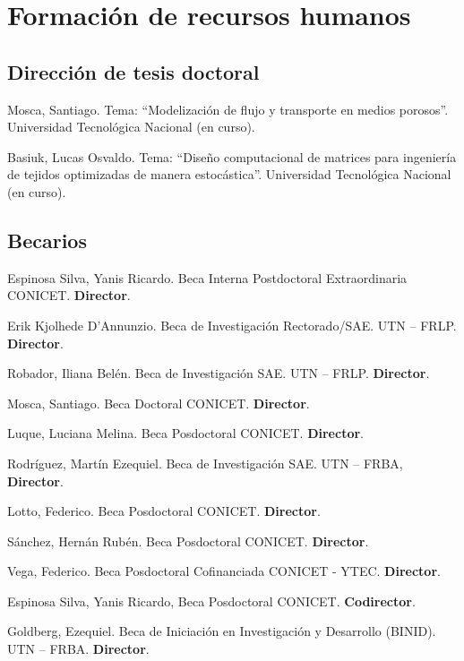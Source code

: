 \section{Formación de recursos humanos}

\subsection{Dirección de tesis doctoral}
 Mosca, Santiago. Tema: ``Modelización de flujo y transporte en medios porosos''. Universidad Tecnológica Nacional (en curso).

 Basiuk, Lucas Osvaldo. Tema: ``Diseño computacional de matrices para ingeniería de tejidos optimizadas de manera estocástica''. Universidad Tecnológica Nacional  (en curso).

\subsection{Becarios}

     Espinosa Silva, Yanis Ricardo. Beca Interna Postdoctoral Extraordinaria CONICET. \textbf{Director}.

     Erik Kjolhede D'Annunzio. Beca de Investigación Rectorado/SAE. UTN -- FRLP. \textbf{Director}.

     Robador, Iliana Belén. Beca de Investigación SAE. UTN -- FRLP. \textbf{Director}.

     Mosca, Santiago. Beca Doctoral CONICET. \textbf{Director}.

     Luque, Luciana Melina. Beca Posdoctoral CONICET. \textbf{Director}.

     Rodríguez, Martín Ezequiel. Beca de Investigación SAE. UTN -- FRBA, \textbf{Director}.

     Lotto, Federico. Beca Posdoctoral CONICET. \textbf{Director}.

     Sánchez, Hernán Rubén. Beca Posdoctoral CONICET. \textbf{Director}.

     Vega, Federico. Beca Posdoctoral Cofinanciada CONICET - YTEC. \textbf{Director}.

     Espinosa Silva, Yanis Ricardo, Beca Posdoctoral CONICET. \textbf{Codirector}.

     Goldberg, Ezequiel. Beca de Iniciación en Investigación y Desarrollo (BINID). UTN -- FRBA. \textbf{Director}.

